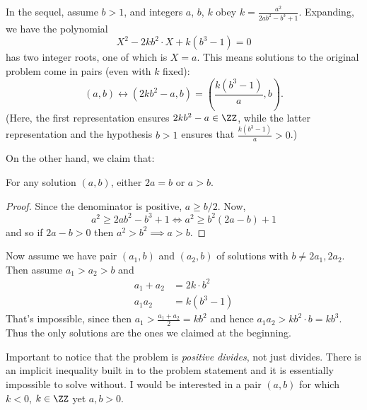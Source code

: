 \documentclass[11pt]{scrartcl}
\begin{document}
In the sequel, assume $b > 1$,
and integers $a$, $b$, $k$ obey $k = \frac{a^2}{2ab^2-b^3+1}$.
Expanding, we have the polynomial
\[ X^2 - 2kb^2 \cdot X + k(b^3-1) = 0 \]
has two integer roots, one of which is $X = a$.
This means solutions to the original problem come in pairs
(even with $k$ fixed):
\[ (a,b) \longleftrightarrow
  \left( 2kb^2 - a, b\right)
  = \left( \frac{k(b^3-1)}{a}, b\right). \]
(Here, the first representation ensures
$2kb^2-a \in \ZZ$,
while the latter representation and the hypothesis $b > 1$ ensures
that $\frac{k(b^3-1)}{a} > 0$.)

On the other hand, we claim that:
\begin{claim*}
For any solution $(a,b)$,
either $2a = b$ or $a > b$.
\end{claim*}
\begin{proof}
  Since the denominator is positive, $a \ge b/2$.
  Now,
  \[ a^2 \ge 2ab^2 - b^3 + 1 \iff a^2 \ge b^2(2a-b) + 1 \]
  and so if $2a - b > 0$ then $a^2 > b^2 \implies a > b$.
\end{proof}

Now assume we have pair $(a_1, b)$ and $(a_2, b)$
of solutions with $b \neq 2a_1, 2a_2$.
Then assume $a_1 > a_2 > b$ and
\begin{align*}
  a_1 + a_2 &= 2k \cdot b^2 \\
  a_1a_2 &= k(b^3-1)
\end{align*}
That's impossible, since then $a_1 > \frac{a_1+a_2}{2} = k b^2$
and hence $a_1a_2 > kb^2 \cdot b = kb^3$.
Thus the only solutions are the ones we claimed at the beginning.

\begin{remark*}
  Important to notice that the problem is \emph{positive divides},
  not just divides.
  There is an implicit inequality built in to the problem
  statement and it is essentially impossible to solve without.
  I would be interested in a pair $(a,b)$
  for which $k < 0$, $k \in \ZZ$ yet $a, b > 0$.
\end{remark*}
\pagebreak
\end{document}
